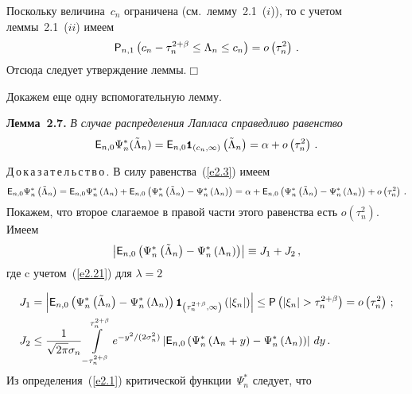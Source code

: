 Поскольку величина~$c_n$ ограничена (см.\ лемму~2.1~($i$)), то с учетом леммы~2.1~($ii$) имеем
$$
{{\sf P}}_{n,1}\left(c_n-\tau_n^{2+\beta}\leq\Lambda_n\leq c_n\right)= o\left(\tau_n^2\right)\,.
$$
Отсюда следует утверждение леммы.\hfill$\Box$


Докажем еще одну вспомогательную лемму.


\medskip

\noindent
\textbf{Лемма~2.7.} {\it В случае распределения Лапласа справедливо равенство
$$
{{\sf E}}_{n,0}\Psi_n^*(\tilde\Lambda_n)={{\sf E}}_{n,0}{\mbox{{\small \tt {1}}\hspace{-1.5mm}{\tt 1}}}_{\left(c_n,\infty\right)}
\left(\tilde\Lambda_n\right)=\alpha+ o\left(\tau_n^2\right)\,.
$$ }



\noindent
Д\,о\,к\,а\,з\,а\,т\,е\,л\,ь\,с\,т\,в\,о\,.
В силу равенства~(\ref{e2.3}) имеем
\begin{equation*}
{{\sf E}}_{n,0}\Psi_n^*\left(\tilde\Lambda_n\right)={{\sf E}}_{n,0}\Psi_n^*\left(\Lambda_n\right)+
{{\sf E}}_{n,0}\left(\Psi_n^*\left(\tilde\Lambda_n\right)-\Psi_n^*\left(\Lambda_n\right)\right)
=\alpha+{{\sf E}}_{n,0}\left(\Psi_n^*\left(\tilde\Lambda_n\right)-\Psi_n^*\left(\Lambda_n\right)\right)+ o\left(\tau_n^2\right)\,.
\end{equation*}
Покажем, что второе слагаемое в правой части этого равенства есть $o\left(\tau_n^2\right)$. Имеем
$$
\left|{{\sf E}}_{n,0}\left(\Psi_n^*\left(\tilde\Lambda_n\right)-\Psi_n^*\left(\Lambda_n\right)\right) \right|\equiv J_1+J_2\,,
$$
где c учетом~(\ref{e2.21}) для $\lambda=2$

\noindent
\begin{align*}
J_1&=\left|{\e}_{n,0}\left(\Psi_n^*\left(\tilde\Lambda_n\right)-\Psi_n^*\left(\Lambda_n\right)\right)
{\Ik}_{\left(\tau_n^{2+\beta},\infty\right)}\left(\left|\xi_n\right|\right) \right|
\leq{\p}\left(\left|\xi_n\right|>\tau_n^{2+\beta}\right)= o\left(\tau_n^2\right)\,;\\
J_2&\leq \fr{1}{\sqrt{2\pi}\sigma_n}\int\limits_{-\tau_n^{2+\beta}}^{\tau_n^{2+\beta}}
e^{-y^2/(2\sigma_n^2)}
\left| {\e}_{n,0}\left(\Psi_n^*\left(\Lambda_n+y\right) - \Psi_n^*\left(\Lambda_n\right)\right) \right|\,dy\,.
\end{align*}
Из определения~(\ref{e2.1}) критической функции~$\Psi_n^*$ следует, что
\pagebreak

